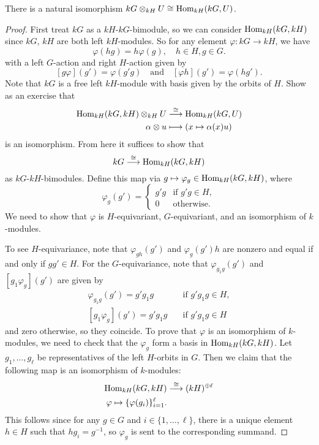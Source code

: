 \begin{prop}
  There is a natural
  isomorphism
  $kG \otimes_{kH} U \cong \operatorname{Hom}_{kH}(kG, U)$.
\end{prop}

\begin{proof}
  First treat $kG$ as a $kH$-$kG$-bimodule,
  so we can consider $\operatorname{Hom}_{kH}(kG, kH)$
  since $kG$, $kH$ are both left
  $kH$-modules. So for any element
  $\varphi : kG \to kH$, we have
  \[
    \varphi(hg) = h \varphi(g), \quad
    h \in H, g \in G.
  \]
  with a left $G$-action and
  right $H$-action given by
  \[
    [g \varphi](g')
    = \varphi(g' g) \quad
    \text{and} \quad
    [\varphi h](g') = \varphi(h g').
  \]
  Note that $kG$ is a free left $kH$-module
  with basis given by the orbits of $H$.
  Show as an exercise that
  \begin{align*}
  \operatorname{Hom}_{kH}(kG, kH)
  \otimes_{kH} U
  &\overset{\cong}{\longrightarrow}
  \operatorname{Hom}_{kH}(kG, U) \\
  \alpha \otimes u
  &\longmapsto
  (x \mapsto \alpha(x) u)
  \end{align*}
  is an isomorphism. From here it suffices
  to show that
  \[
    kG \overset{\cong}{\longrightarrow}
    \operatorname{Hom}_{kH}(kG, kH)
  \]
  as $kG$-$kH$-bimodules. Define this map
  via $g \mapsto \varphi_g \in \operatorname{Hom}_{kH}(kG, kH)$,
  where
  \[
    \varphi_g(g') =
    \begin{cases}
      g' g & \text{if } g' g \in H, \\
      0 & \text{otherwise}.
    \end{cases}
  \]
  We need to show that $\varphi$ is
  $H$-equivariant, $G$-equivariant, and
  an isomorphism of $k$-modules.

  To see $H$-equivariance, note that
  $\varphi_{gh}(g')$ and $\varphi_g(g') h$
  are nonzero and equal if and only if
  $g g' \in H$. For the
  $G$-equivariance, note that
  $\varphi_{g_1 g}(g')$ and
  $[g_1 \varphi_g](g')$ are given by
  \begin{align*}
    \varphi_{g_1 g} (g')
    = g' g_1 g
    \quad &\text{if } g' g_1 g \in H, \\
    [g_1 \varphi_g](g')
    = g' g_1 g
    \quad &\text{if } g' g_1 g \in H
  \end{align*}
  and zero otherwise, so they coincide.
  To prove that $\varphi$ is an
  isomorphism of $k$-modules, we need to
  check that the $\varphi_g$ form a
  basis in $\operatorname{Hom}_{kH}(kG, kH)$.
  Let $g_1, \dots, g_\ell$ be representatives
  of the left $H$-orbits in $G$. Then we
  claim that the following map is an
  isomorphism of $k$-modules:
  \begin{align*}
    \operatorname{Hom}_{kH}(kG, kH)
    &\overset{\cong}{\longrightarrow}
    (kH)^{\oplus \ell} \\
    \varphi \mapsto \{\varphi(g_i)\}_{i = 1}^\ell.
  \end{align*}
  This follows since for any $g \in G$ and
  $i \in \{1, \dots, \ell\}$,
  there is a unique element $h \in H$
  such that $h g_i = g^{-1}$, so
  $\varphi_g$ is sent to the corresponding
  summand.
\end{proof}

